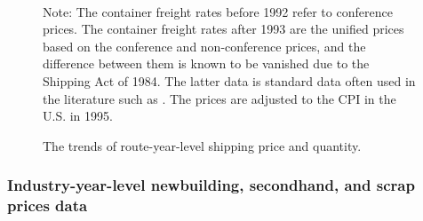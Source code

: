 \documentclass[11pt]{article}
\begin{document}
\begin{figure}[!ht]
\begin{center}
  \\
  \caption{The trends of route-year-level shipping price and quantity.}
  \label{fg:container_freight_rate_and_shipping_quantity_each_route}
  \end{center}
\footnotesize
   Note: The container freight rates before 1992 refer to conference prices. The container freight rates after 1993 are the unified prices based on the conference and non-conference prices, and the difference between them is known to be vanished due to the Shipping Act of 1984. The latter data is standard data often used in the literature such as \cite{jeon2022learning}. The prices are adjusted to the CPI in the U.S. in 1995.
\end{figure}


\subsubsection{Industry-year-level newbuilding, secondhand, and scrap prices data}
\end{document}
